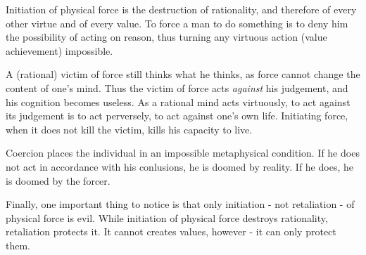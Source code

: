         Initiation of physical force is the destruction of rationality, and therefore of every other virtue and of every value. To force a man to do something is to deny him the possibility of acting on reason, thus turning any virtuous action (value achievement) impossible.
        
        A (rational) victim of force still thinks what he thinks, as force cannot change the content of one's mind. Thus the victim of force acts \textit{against} his judgement, and his cognition becomes useless. As a rational mind acts virtuously, to act against its judgement is to act perversely, to act against one's own life. Initiating force, when it does not kill the victim, kills his capacity to live.

        Coercion places the individual in an impossible metaphysical condition. If he does not act in accordance with his conlusions, he is doomed by reality. If he does, he is doomed by the forcer.

        Finally, one important thing to notice is that only initiation - not retaliation - of physical force is evil. While initiation of physical force destroys rationality, retaliation protects it. It cannot creates values, however - it can only protect them.